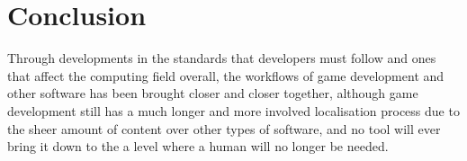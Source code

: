 \documentclass{scrartcl}
\begin{document}
\section{Conclusion}
Through developments in the standards that developers must follow and ones that affect the computing field overall, the workflows of game development and other software has been brought closer and closer together, although game development still has a much longer and more involved localisation process due to the sheer amount of content over other types of software, and no tool will ever bring it down to the a level where a human will no longer be needed.




\end{document}
